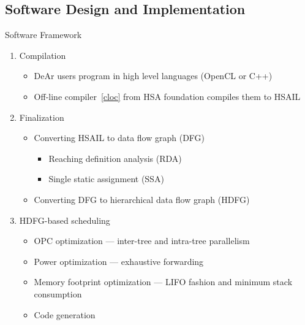 \documentclass{beamer}
\begin{document}
\begin{CJK}{UTF8}{bkai}
    \subsection{Software Design and Implementation}
    \begin{frame}{Software Framework}
        \begin{enumerate}
            \item Compilation
                \begin{itemize}
                    \item DeAr users program in high level languages (OpenCL or C++)
                    \item Off-line compiler~\ref{cloc} from HSA foundation compiles them to HSAIL
                \end{itemize}
            \item Finalization
                \begin{itemize}
                    \item Converting HSAIL to data flow graph (DFG)
                        \begin{itemize}
                            \item Reaching definition analysis (RDA)
                            \item Single static assignment (SSA)
                        \end{itemize}
                    \item Converting DFG to hierarchical data flow graph (HDFG)
                \end{itemize}
            \item HDFG-based scheduling
                \begin{itemize}
                    \item OPC optimization --- inter-tree and intra-tree parallelism
                    \item Power optimization --- exhaustive forwarding
                    \item Memory footprint optimization --- LIFO fashion and minimum stack consumption
                    \item Code generation
                \end{itemize}
        \end{enumerate}
    \end{frame}


\end{CJK}
\end{document}
